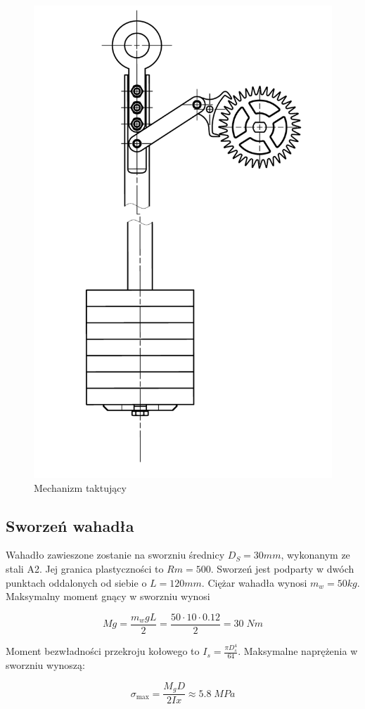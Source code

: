			\begin{figure}[t]
				\centering
				\includegraphics[width=0.6\linewidth]{Projekt/takt}
				\caption{Mechanizm taktujący}
				\label{fig:takt}
			\end{figure}
			
		\subsection{Sworzeń wahadła}
		
		Wahadło zawieszone zostanie na sworzniu średnicy \(D_S = 30 mm\), wykonanym ze stali A2. Jej granica plastyczności to \(Rm = 500\). Sworzeń jest podparty w dwóch punktach oddalonych od siebie o \(L = 120 mm\). Ciężar wahadła wynosi \( m_w =50 kg\). Maksymalny moment gnący w sworzniu wynosi
		
		\begin{equation}
		Mg = \frac{m_w g L}{2} = \frac{50 \cdot 10 \cdot 0.12}{2} = 30\; Nm
		\end{equation}
			
Moment bezwładności przekroju kołowego to \(I_s = \frac{\pi D_s^4}{64}\). Maksymalne naprężenia w sworzniu wynoszą:

\begin{equation}
\sigma_{\max} = \frac{M_g D}{2Ix} \approx 5.8\; MPa
\end{equation}


